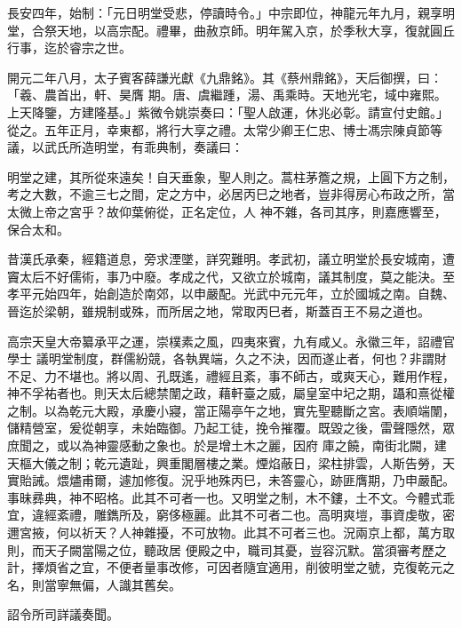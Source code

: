 \begin{pinyinscope}
 長安四年，始制：「元日明堂受悲，停讀時令。」中宗即位，神龍元年九月，親享明堂，合祭天地，以高宗配。禮畢，曲赦京師。明年駕入京，於季秋大享，復就圓丘行事，迄於睿宗之世。



 開元二年八月，太子賓客薛謙光獻《九鼎銘》。其《蔡州鼎銘》，天后御撰，曰：「羲、農首出，軒、昊膺
 期。唐、虞繼踵，湯、禹乘時。天地光宅，域中雍熙。上天降鑒，方建隆基。」紫微令姚崇奏曰：「聖人啟運，休兆必彰。請宣付史館。」從之。五年正月，幸東都，將行大享之禮。太常少卿王仁忠、博士馮宗陳貞節等議，以武氏所造明堂，有乖典制，奏議曰：



 明堂之建，其所從來遠矣！自天垂象，聖人則之。蒿柱茅簷之規，上圓下方之制，考之大數，不逾三七之間，定之方中，必居丙巳之地者，豈非得房心布政之所，當太微上帝之宮乎？故仰葉俯從，正名定位，人
 神不雜，各司其序，則嘉應響至，保合太和。



 昔漢氏承秦，經籍道息，旁求湮墜，詳究難明。孝武初，議立明堂於長安城南，遭竇太后不好儒術，事乃中廢。孝成之代，又欲立於城南，議其制度，莫之能決。至孝平元始四年，始創造於南郊，以申嚴配。光武中元元年，立於國城之南。自魏、晉迄於梁朝，雖規制或殊，而所居之地，常取丙巳者，斯蓋百王不易之道也。



 高宗天皇大帝纂承平之運，崇樸素之風，四夷來賓，九有咸乂。永徽三年，詔禮官學士
 議明堂制度，群儒紛競，各執異端，久之不決，因而遂止者，何也？非謂財不足、力不堪也。將以周、孔既遙，禮經且紊，事不師古，或爽天心，難用作程，神不孚祐者也。則天太后總禁闈之政，藉軒臺之威，屬皇室中圮之期，躡和熹從權之制。以為乾元大殿，承慶小寢，當正陽亭午之地，實先聖聽斷之宮。表順端闈，儲精營室，爰從朝享，未始臨御。乃起工徒，挽令摧覆。既毀之後，雷聲隱然，眾庶聞之，或以為神靈感動之象也。於是增土木之麗，因府
 庫之饒，南街北闕，建天樞大儀之制；乾元遺趾，興重閣層樓之業。煙焰蔽日，梁柱排雲，人斯告勞，天實貽誡。煨燼甫爾，遽加修復。況乎地殊丙巳，未答靈心，跡匪膺期，乃申嚴配。事昧彞典，神不昭格。此其不可者一也。又明堂之制，木不鏤，土不文。今體式乖宜，違經紊禮，雕鐫所及，窮侈極麗。此其不可者二也。高明爽塏，事資虔敬，密邇宮掖，何以祈天？人神雜擾，不可放物。此其不可者三也。況兩京上都，萬方取則，而天子闕當陽之位，聽政居
 便殿之中，職司其憂，豈容沉默。當須審考歷之計，擇煩省之宜，不便者量事改修，可因者隨宜適用，削彼明堂之號，克復乾元之名，則當寧無偏，人識其舊矣。



 詔令所司詳議奏聞。




\end{pinyinscope}
